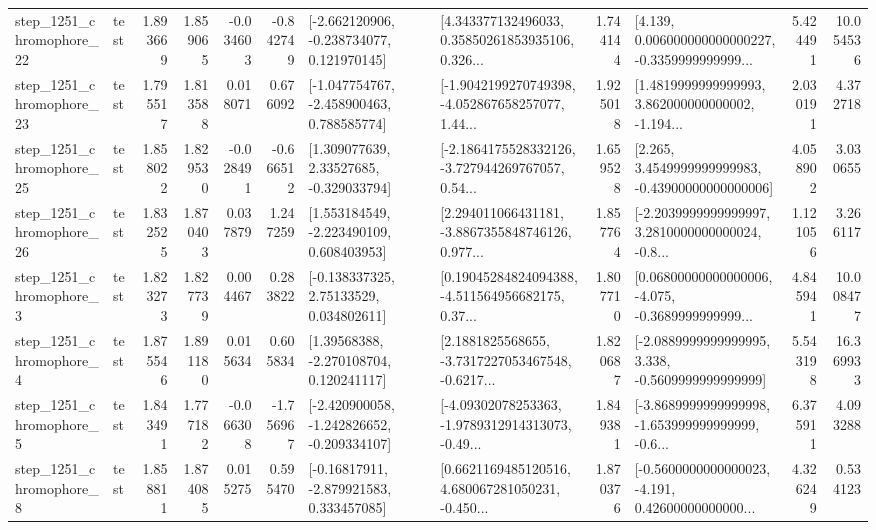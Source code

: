 \begin{tabular}{llrrrrllrlrr}
 step\_1251\_chromophore\_22 &      test &      1.893669 &    1.859065 &     -0.034603 & -0.842749 &   [-2.662120906, -0.238734077, 0.121970145] &  [4.343377132496033, 0.35850261853935106, 0.326... &       1.744144 &  [4.139, 0.006000000000000227, -0.3359999999999... &            5.424491 &         10.054536 \\
 step\_1251\_chromophore\_23 &      test &      1.795517 &    1.813588 &      0.018071 &  0.676092 &   [-1.047754767, -2.458900463, 0.788585774] &  [-1.9042199270749398, -4.052867658257077, 1.44... &       1.925018 &  [1.4819999999999993, 3.862000000000002, -1.194... &            2.030191 &          4.372718 \\
 step\_1251\_chromophore\_25 &      test &      1.858022 &    1.829530 &     -0.028491 & -0.666512 &     [1.309077639, 2.33527685, -0.329033794] &  [-2.1864175528332126, -3.727944269767057, 0.54... &       1.659528 &  [2.265, 3.4549999999999983, -0.43900000000000006] &            4.058902 &          3.030655 \\
 step\_1251\_chromophore\_26 &      test &      1.832525 &    1.870403 &      0.037879 &  1.247259 &    [1.553184549, -2.223490109, 0.608403953] &  [2.294011066431181, -3.8867355848746126, 0.977... &       1.857764 &  [-2.2039999999999997, 3.2810000000000024, -0.8... &            1.121056 &          3.266117 \\
  step\_1251\_chromophore\_3 &      test &      1.823273 &    1.827739 &      0.004467 &  0.283822 &     [-0.138337325, 2.75133529, 0.034802611] &  [0.19045284824094388, -4.511564956682175, 0.37... &       1.807710 &  [0.06800000000000006, -4.075, -0.3689999999999... &            4.845941 &         10.008477 \\
  step\_1251\_chromophore\_4 &      test &      1.875546 &    1.891180 &      0.015634 &  0.605834 &     [1.39568388, -2.270108704, 0.120241117] &  [2.1881825568655, -3.7317227053467548, -0.6217... &       1.820687 &  [-2.0889999999999995, 3.338, -0.5609999999999999] &            5.543198 &         16.369933 \\
  step\_1251\_chromophore\_5 &      test &      1.843491 &    1.777182 &     -0.066308 & -1.756967 &  [-2.420900058, -1.242826652, -0.209334107] &  [-4.09302078253363, -1.9789312914313073, -0.49... &       1.849381 &  [-3.8689999999999998, -1.653999999999999, -0.6... &            6.375911 &          4.093288 \\
  step\_1251\_chromophore\_8 &      test &      1.858811 &    1.874085 &      0.015275 &  0.595470 &    [-0.16817911, -2.879921583, 0.333457085] &  [0.6621169485120516, 4.680067281050231, -0.450... &       1.870376 &  [-0.5600000000000023, -4.191, 0.42600000000000... &            4.326249 &          0.534123 \\

\end{tabular}

